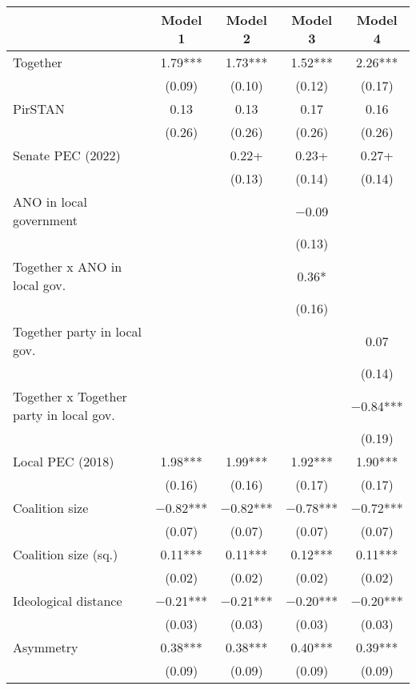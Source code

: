 \begin{table}
\centering
\begin{tabular}[t]{lcccc}
\toprule
  & Model 1 & Model 2 & Model 3 & Model 4\\
\midrule
Together & \num{1.79}*** & \num{1.73}*** & \num{1.52}*** & \num{2.26}***\\
 & (\num{0.09}) & (\num{0.10}) & (\num{0.12}) & (\num{0.17})\\
PirSTAN & \num{0.13} & \num{0.13} & \num{0.17} & \num{0.16}\\
 & (\num{0.26}) & (\num{0.26}) & (\num{0.26}) & (\num{0.26})\\
Senate PEC (2022) &  & \num{0.22}+ & \num{0.23}+ & \num{0.27}+\\
 &  & (\num{0.13}) & (\num{0.14}) & (\num{0.14})\\
ANO in local government &  &  & \num{-0.09} & \\
 &  &  & (\num{0.13}) & \\
Together x ANO in local gov. &  &  & \num{0.36}* & \\
 &  &  & (\num{0.16}) & \\
Together party in local gov. &  &  &  & \num{0.07}\\
 &  &  &  & (\num{0.14})\\
Together x Together party in local gov. &  &  &  & \num{-0.84}***\\
 &  &  &  & (\num{0.19})\\
Local PEC (2018) & \num{1.98}*** & \num{1.99}*** & \num{1.92}*** & \num{1.90}***\\
 & (\num{0.16}) & (\num{0.16}) & (\num{0.17}) & (\num{0.17})\\
Coalition size & \num{-0.82}*** & \num{-0.82}*** & \num{-0.78}*** & \num{-0.72}***\\
 & (\num{0.07}) & (\num{0.07}) & (\num{0.07}) & (\num{0.07})\\
Coalition size (sq.) & \num{0.11}*** & \num{0.11}*** & \num{0.12}*** & \num{0.11}***\\
 & (\num{0.02}) & (\num{0.02}) & (\num{0.02}) & (\num{0.02})\\
Ideological distance & \num{-0.21}*** & \num{-0.21}*** & \num{-0.20}*** & \num{-0.20}***\\
 & (\num{0.03}) & (\num{0.03}) & (\num{0.03}) & (\num{0.03})\\
Asymmetry & \num{0.38}*** & \num{0.38}*** & \num{0.40}*** & \num{0.39}***\\
 & (\num{0.09}) & (\num{0.09}) & (\num{0.09}) & (\num{0.09})\\

\end{tabular}
\end{table}
